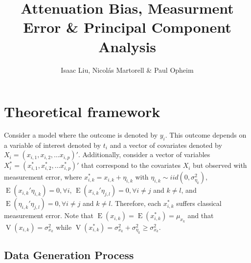 \documentclass[12pt]{article}
\begin{document}
\thispagestyle{firststyle}

\author{Isaac Liu, Nicol\'as Martorell \& Paul Opheim}
\title{Attenuation Bias, Measurment Error \& Principal Component Analysis} 
\maketitle



\section{Theoretical framework}

Consider a model where the outcome is denoted by $y_i$. This outcome depends on a variable of interest denoted by $t_i$ and a vector of covariates denoted by $X_i=(x_{i,1},x_{i,2},\dots x_{i,p})'$. Additionally, consider a vector of variables $X^*_i=(x^*_{i,1},x^*_{i,2},\dots x^*_{i,p})'$ that correspond to the covariates $X_i$ but observed with measurement error, where $x^*_{i,k}=x_{i,k}+\eta_{i,k}$ with $\eta_{i,k} \sim {iid}(0,\sigma^2_{\eta_k})$, $\operatorname{E}(x_{i,k}'\eta_{i,k})=0, \forall i$, $\operatorname{E}(x_{i,k}'\eta_{j,l})=0, \forall i\neq j$ and $k \neq l$, and $\operatorname{E}(\eta_{i,k}'\eta_{j,l})=0, \forall i\neq j$ and $k \neq l$. Therefore, each $x^*_{i,k}$ suffers classical measurement error. Note that $\operatorname{E}(x_{i,k})=\operatorname{E}(x^*_{i,k})=\mu_{x_k}$ and that $\operatorname{V}(x_{i,k})=\sigma^2_{x_k}$ while $\operatorname{V}(x^*_{i,k})=\sigma^2_{x_k}+\sigma^2_{\eta_k}\geq \sigma^2_{x_k}$.

\subsection{Data Generation Process}
\end{document}
